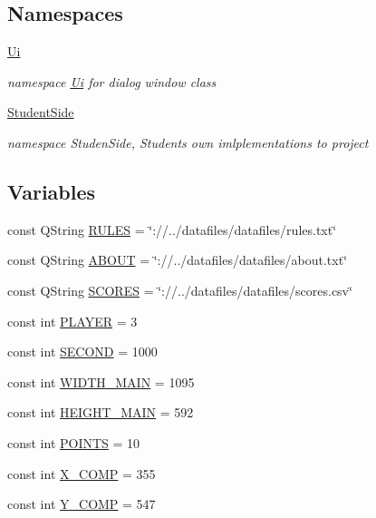 \subsection*{Namespaces}
\begin{DoxyCompactItemize}
\item 
\hyperlink{namespace_ui}{Ui}
\begin{DoxyCompactList}\small\item\em namespace \hyperlink{namespace_ui}{Ui} for dialog window class \end{DoxyCompactList}\item 
\hyperlink{namespace_student_side}{Student\-Side}
\begin{DoxyCompactList}\small\item\em namespace Studen\-Side, Students own imlplementations to project \end{DoxyCompactList}\end{DoxyCompactItemize}
\subsection*{Variables}
\begin{DoxyCompactItemize}
\item 
const Q\-String \hyperlink{mainwindow_8hh_afad7eb5ce267412e261321798f276542}{R\-U\-L\-E\-S} = \char`\"{}\-://../datafiles/datafiles/rules.\-txt\char`\"{}
\item 
const Q\-String \hyperlink{mainwindow_8hh_add086dddfd1041a943afc24d4fc5217e}{A\-B\-O\-U\-T} = \char`\"{}\-://../datafiles/datafiles/about.\-txt\char`\"{}
\item 
const Q\-String \hyperlink{mainwindow_8hh_a0012746528a3f7abc7de472e05a9e30c}{S\-C\-O\-R\-E\-S} = \char`\"{}\-://../datafiles/datafiles/scores.\-csv\char`\"{}
\item 
const int \hyperlink{mainwindow_8hh_ad18a55885568d3324c55bdefa31112ba}{P\-L\-A\-Y\-E\-R} = 3
\item 
const int \hyperlink{mainwindow_8hh_a50077804d4a057181d4f05a294a15ca1}{S\-E\-C\-O\-N\-D} = 1000
\item 
const int \hyperlink{mainwindow_8hh_a119c8f137ad0941c9930319665d01abb}{W\-I\-D\-T\-H\-\_\-\-M\-A\-I\-N} = 1095
\item 
const int \hyperlink{mainwindow_8hh_a8a9a3d327e245d16d8af8d57ac0428fc}{H\-E\-I\-G\-H\-T\-\_\-\-M\-A\-I\-N} = 592
\item 
const int \hyperlink{mainwindow_8hh_adf877364b47d0f0beade7967f248355c}{P\-O\-I\-N\-T\-S} = 10
\item 
const int \hyperlink{mainwindow_8hh_a01bc9f3900a2569418be75ff477c6462}{X\-\_\-\-C\-O\-M\-P} = 355
\item 
const int \hyperlink{mainwindow_8hh_a33040b291915efa0c17ff1a72a00a119}{Y\-\_\-\-C\-O\-M\-P} = 547
\end{DoxyCompactItemize}



